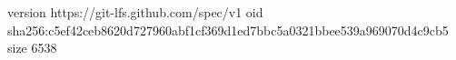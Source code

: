 version https://git-lfs.github.com/spec/v1
oid sha256:c5ef42ceb8620d727960abf1cf369d1ed7bbc5a0321bbee539a969070d4c9cb5
size 6538

